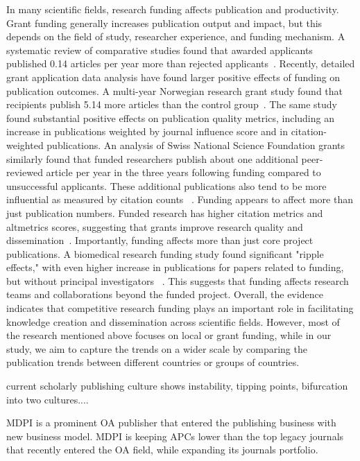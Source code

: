 \documentclass[amsfonts, amssymb, prl, superscriptaddress, notitlepage, twocolumn, nofootinbib]{revtex4-2}
\begin{document}
In many scientific fields, research funding affects publication and productivity. Grant funding generally increases publication output and impact, but this depends on the field of study, researcher experience, and funding mechanism. A systematic review of comparative studies found that awarded applicants published 0.14 articles per year more than rejected applicants~\cite{saygitov2018impact}. Recently, detailed grant application data analysis have found larger positive effects of funding on publication outcomes. A multi-year Norwegian research grant study found that recipients publish 5.14 more articles than the control group~\cite{adda2023impact}. The same study found substantial positive effects on publication quality metrics, including an increase in publications weighted by journal influence score and in citation-weighted publications. An analysis of Swiss National Science Foundation grants similarly found that funded researchers publish about one additional peer-reviewed article per year in the three years following funding compared to unsuccessful applicants. These additional publications also tend to be more influential as measured by citation counts ~\cite{ heyard2021value}. Funding appears to affect more than just publication numbers. Funded research has higher citation metrics and altmetrics scores, suggesting that grants improve research quality and dissemination~\cite{heyard2021value}. Importantly, funding affects more than just core project publications. A biomedical research funding study found significant "ripple effects," with even higher increase in publications for papers related to funding, but without principal investigators ~\cite{sattari2022ripple}. This suggests that funding affects research teams and collaborations beyond the funded project. Overall, the evidence indicates that competitive research funding plays an important role in facilitating knowledge creation and dissemination across scientific fields. However, most of the research mentioned above focuses on local or grant funding, while in our study, we aim to capture the trends on a wider scale by comparing the publication trends between different countries or groups of countries.

current scholarly publishing culture shows instability, tipping points, bifurcation into two cultures....

MDPI is a prominent OA publisher that 
entered the publishing business with new business model. MDPI is keeping APCs lower than
the top legacy journals that recently entered the OA field, while expanding its journals portfolio.
\end{document}
